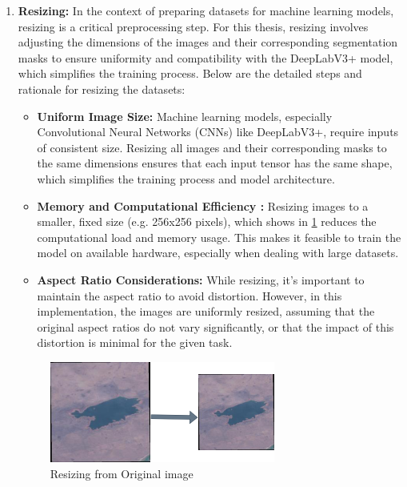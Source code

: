 \begin{enumerate}
  \item \textbf{Resizing: }In the context of preparing datasets for machine learning models, resizing is a critical preprocessing step. For this thesis, resizing involves adjusting the dimensions of the images and their corresponding segmentation masks to ensure uniformity and compatibility with the DeepLabV3+ model, which simplifies the training process. Below are the detailed steps and rationale for resizing the datasets:
  \begin{itemize}
      \item \textbf{Uniform Image Size:} Machine learning models, especially Convolutional Neural Networks (CNNs) like DeepLabV3+, require inputs of consistent size. Resizing all images and their corresponding masks to the same dimensions ensures that each input tensor has the same shape, which simplifies the training process and model architecture.
      \item \textbf{Memory and Computational Efficiency : }Resizing images to a smaller, fixed size (e.g. 256x256 pixels), which shows in \ref{res} reduces the computational load and memory usage. This makes it feasible to train the model on available hardware, especially when dealing with large datasets.
      \item \textbf{Aspect Ratio Considerations: }While resizing, it's important to maintain the aspect ratio to avoid distortion. However, in this implementation, the images are uniformly resized, assuming that the original aspect ratios do not vary significantly, or that the impact of this distortion is minimal for the given task. 
      \\
  \end{itemize}

\begin{figure}[H]
\centering
\includegraphics[width= 0.7\textwidth]{figs/resize.png}
\caption{Resizing from Original image}
\label{res}
\end{figure}




\end{enumerate}
